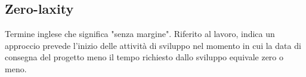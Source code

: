 	\subsection{Zero-laxity}
	\label{sec:zerolaxity}
	Termine inglese che significa "senza margine". Riferito al lavoro, indica un approccio prevede l'inizio delle attività di sviluppo nel momento in cui la data di consegna del progetto meno il tempo richiesto dallo sviluppo equivale zero o meno.

